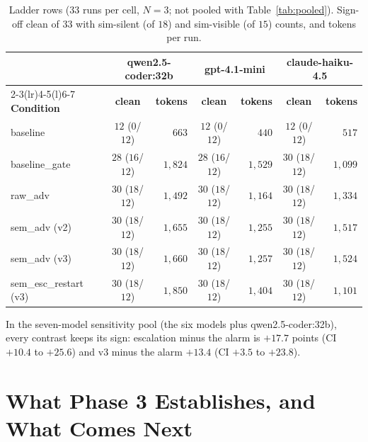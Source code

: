 \documentclass[11pt]{article}
\begin{document}
\begin{table}[htbp]
\centering
\caption{Ladder rows ($33$ runs per cell, $N{=}3$; not pooled with
Table~\ref{tab:pooled}). Sign-off clean of $33$ with sim-silent (of $18$) and
sim-visible (of $15$) counts, and tokens per run.}
\label{tab:ladder}
\small
\begin{tabular}{@{}l cr cr cr@{}}
\toprule
 & \multicolumn{2}{c}{\textbf{qwen2.5-coder:32b}} & \multicolumn{2}{c}{\textbf{gpt-4.1-mini}} & \multicolumn{2}{c}{\textbf{claude-haiku-4.5}} \\
\cmidrule(lr){2-3}\cmidrule(lr){4-5}\cmidrule(l){6-7}
\textbf{Condition} & \textbf{clean} & \textbf{tokens} & \textbf{clean} & \textbf{tokens} & \textbf{clean} & \textbf{tokens} \\
\midrule
baseline               & $12$ ($0$/$12$)  & $663$     & $12$ ($0$/$12$)  & $440$     & $12$ ($0$/$12$)  & $517$ \\
baseline\_gate         & $28$ ($16$/$12$) & $1{,}824$ & $28$ ($16$/$12$) & $1{,}529$ & $30$ ($18$/$12$) & $1{,}099$ \\
raw\_adv               & $30$ ($18$/$12$) & $1{,}492$ & $30$ ($18$/$12$) & $1{,}164$ & $30$ ($18$/$12$) & $1{,}334$ \\
sem\_adv (v2)          & $30$ ($18$/$12$) & $1{,}655$ & $30$ ($18$/$12$) & $1{,}255$ & $30$ ($18$/$12$) & $1{,}517$ \\
sem\_adv (v3)          & $30$ ($18$/$12$) & $1{,}660$ & $30$ ($18$/$12$) & $1{,}257$ & $30$ ($18$/$12$) & $1{,}524$ \\
sem\_esc\_restart (v3) & $30$ ($18$/$12$) & $1{,}850$ & $30$ ($18$/$12$) & $1{,}404$ & $30$ ($18$/$12$) & $1{,}101$ \\
\bottomrule
\end{tabular}
\end{table}

In the seven-model sensitivity pool (the six models plus qwen2.5-coder:32b),
every contrast keeps its sign: escalation minus the alarm is $+17.7$ points
(CI $+10.4$ to $+25.6$) and v3 minus the alarm $+13.4$ (CI $+3.5$ to $+23.8$).

\section{What Phase 3 Establishes, and What Comes Next}
\label{sec:summary}
\end{document}
